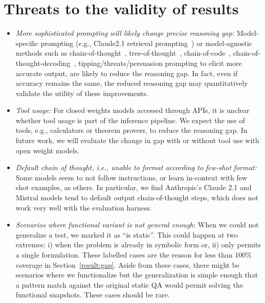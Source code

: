 \documentclass[11pt,a4paper]{article}
\begin{document}
\section{Threats to the validity of results}
\begin{itemize}
  \item {\em More sophisticated prompting will likely change precise reasoning
    gap:} Model-specific prompting (e.g., Claude2.1 retrieval
    prompting~\cite{claude-retrieval-prompting}) or model-agnostic methods such
    as chain-of-thought~\cite{chain-of-thought},
    tree-of-thought~\cite{tree-of-thought}, chain-of-code~\cite{chain-of-code},
    chain-of-thought-decoding~\cite{cot-decoding},
    tipping/threats/persuasion prompting to elicit more accurate output, are
    likely to reduce the reasoning gap. In fact, even if accuracy remains the
    same, the reduced reasoning gap may quantitatively validate the utility of
    these improvements.

  \item {\em Tool usage:} For closed weights models accessed through APIs, it is
    unclear whether tool usage is part of the inference pipeline. We expect the
    use of tools, e.g., calculators or theorem provers, to reduce the reasoning
    gap. In future work, we will evaluate the change in gap with or without
    tool use with open weight models.

  \item {\em Default chain of thought, i.e., unable to format according to
    few-shot format:} Some models seem to not follow instructions, or learn in-context
    with few shot examples, as others. In particular, we find Anthropic's Claude 2.1 and
    Mistral models tend to default output chain-of-thought steps, which does not
    work very well with the evaluation harness.

  \item {\em Scenarios where functional variant is not general enough}: When we
    could not generalize a test, we marked it as ``is static''.  This could
    happen at two extremes: i) when the problem is already in symbolic form or,
    ii) only permits a single formulation. These labelled cases are the reason
    for less than 100\% coverage in Section~\ref{result:gap}. Aside from these
    cases, there might be scenarios where we functionalize but the generalization
    is simple enough that a pattern match against the original static QA would
    permit solving the functional snapshots. These cases should be rare.


\end{itemize}
\end{document}
